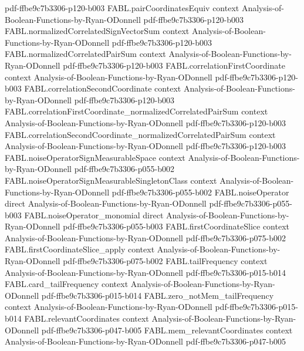 \begin{theorem}
  {pdf-ffbe9c7b3306-p120-b003}
\proofstep
  {FABL.pairCoordinatesEquiv}
  {context}
  {Analysis-of-Boolean-Functions-by-Ryan-ODonnell}
  {pdf-ffbe9c7b3306-p120-b003}
\proofstep
  {FABL.normalizedCorrelatedSignVectorSum}
  {context}
  {Analysis-of-Boolean-Functions-by-Ryan-ODonnell}
  {pdf-ffbe9c7b3306-p120-b003}
\proofstep
  {FABL.normalizedCorrelatedPairSum}
  {context}
  {Analysis-of-Boolean-Functions-by-Ryan-ODonnell}
  {pdf-ffbe9c7b3306-p120-b003}
\proofstep
  {FABL.correlationFirstCoordinate}
  {context}
  {Analysis-of-Boolean-Functions-by-Ryan-ODonnell}
  {pdf-ffbe9c7b3306-p120-b003}
\proofstep
  {FABL.correlationSecondCoordinate}
  {context}
  {Analysis-of-Boolean-Functions-by-Ryan-ODonnell}
  {pdf-ffbe9c7b3306-p120-b003}
\proofstep
  {FABL.correlationFirstCoordinate_normalizedCorrelatedPairSum}
  {context}
  {Analysis-of-Boolean-Functions-by-Ryan-ODonnell}
  {pdf-ffbe9c7b3306-p120-b003}
\proofstep
  {FABL.correlationSecondCoordinate_normalizedCorrelatedPairSum}
  {context}
  {Analysis-of-Boolean-Functions-by-Ryan-ODonnell}
  {pdf-ffbe9c7b3306-p120-b003}
\proofstep
  {FABL.noiseOperatorSignMeasurableSpace}
  {context}
  {Analysis-of-Boolean-Functions-by-Ryan-ODonnell}
  {pdf-ffbe9c7b3306-p055-b002}
\proofstep
  {FABL.noiseOperatorSignMeasurableSingletonClass}
  {context}
  {Analysis-of-Boolean-Functions-by-Ryan-ODonnell}
  {pdf-ffbe9c7b3306-p055-b002}
\proofstep
  {FABL.noiseOperator}
  {direct}
  {Analysis-of-Boolean-Functions-by-Ryan-ODonnell}
  {pdf-ffbe9c7b3306-p055-b003}
\proofstep
  {FABL.noiseOperator_monomial}
  {direct}
  {Analysis-of-Boolean-Functions-by-Ryan-ODonnell}
  {pdf-ffbe9c7b3306-p055-b003}
\proofstep
  {FABL.firstCoordinateSlice}
  {context}
  {Analysis-of-Boolean-Functions-by-Ryan-ODonnell}
  {pdf-ffbe9c7b3306-p075-b002}
\proofstep
  {FABL.firstCoordinateSlice_apply}
  {context}
  {Analysis-of-Boolean-Functions-by-Ryan-ODonnell}
  {pdf-ffbe9c7b3306-p075-b002}
\proofstep
  {FABL.tailFrequency}
  {context}
  {Analysis-of-Boolean-Functions-by-Ryan-ODonnell}
  {pdf-ffbe9c7b3306-p015-b014}
\proofstep
  {FABL.card_tailFrequency}
  {context}
  {Analysis-of-Boolean-Functions-by-Ryan-ODonnell}
  {pdf-ffbe9c7b3306-p015-b014}
\proofstep
  {FABL.zero_notMem_tailFrequency}
  {context}
  {Analysis-of-Boolean-Functions-by-Ryan-ODonnell}
  {pdf-ffbe9c7b3306-p015-b014}
\proofstep
  {FABL.relevantCoordinates}
  {context}
  {Analysis-of-Boolean-Functions-by-Ryan-ODonnell}
  {pdf-ffbe9c7b3306-p047-b005}
\proofstep
  {FABL.mem_relevantCoordinates}
  {context}
  {Analysis-of-Boolean-Functions-by-Ryan-ODonnell}
  {pdf-ffbe9c7b3306-p047-b005}
\proofstep

\end{theorem}

